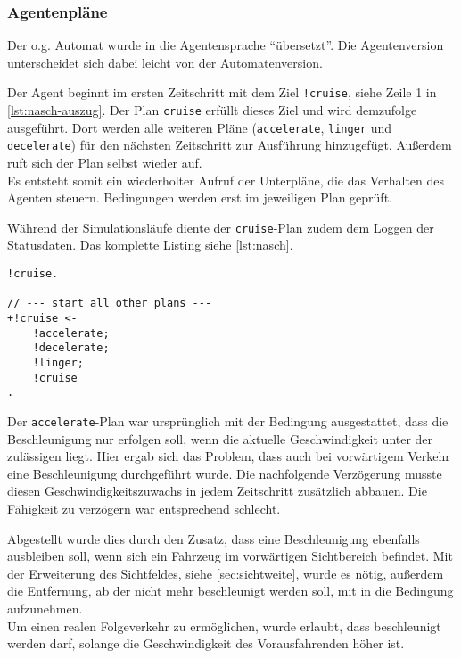 \subsubsection{Agentenpläne}

Der o.g. Automat wurde in die Agentensprache \enquote{übersetzt}. 
Die Agentenversion unterscheidet sich dabei leicht von der Automatenversion. 

Der Agent beginnt im ersten Zeitschritt mit dem Ziel \texttt{!cruise}, siehe Zeile 1 in \cref{lst:nasch-auszug}.
Der Plan \texttt{cruise} erfüllt dieses Ziel und wird demzufolge ausgeführt. 
Dort werden alle weiteren Pläne (\texttt{accelerate}, \texttt{linger} und \texttt{decelerate}) für den nächsten Zeitschritt zur Ausführung hinzugefügt.
Außerdem ruft sich der Plan selbst wieder auf.
\\
Es entsteht somit ein wiederholter Aufruf der Unterpläne, die das Verhalten des Agenten steuern.
Bedingungen werden erst im jeweiligen Plan geprüft.

Während der Simulationsläufe diente der \texttt{cruise}-Plan zudem dem Loggen der Statusdaten.
Das komplette Listing siehe \cref{lst:nasch}.

\begin{minipage}[hptb]{0.95\textwidth}
\begin{lstlisting}[style=asl, 
                   keywords={!cruise}, 
                   keywords={[2]}, 
                   keywords={[3]}, 
                   caption={Auszug aus Agentenscript: single lane-Version},
                   label={lst:nasch-auszug}]      
!cruise.

// --- start all other plans ---
+!cruise <-
    !accelerate;
    !decelerate;
    !linger;
    !cruise
.\end{lstlisting}
\end{minipage}

Der \texttt{accelerate}-Plan war ursprünglich mit der Bedingung ausgestattet, dass die Beschleunigung nur erfolgen soll, wenn die aktuelle Geschwindigkeit unter der zulässigen liegt.
Hier ergab sich das Problem, dass auch bei vorwärtigem Verkehr eine Beschleunigung durchgeführt wurde. Die nachfolgende Verzögerung musste diesen Geschwindigkeitszuwachs in jedem Zeitschritt zusätzlich abbauen.
Die Fähigkeit zu verzögern war entsprechend schlecht.

Abgestellt wurde dies durch den Zusatz, dass eine Beschleunigung ebenfalls ausbleiben soll, wenn sich ein Fahrzeug im vorwärtigen Sichtbereich befindet.
Mit der Erweiterung des Sichtfeldes, siehe \cref{sec:sichtweite}, wurde es nötig, außerdem die Entfernung, ab der nicht mehr beschleunigt werden soll, mit in die Bedingung aufzunehmen.
\\
Um einen realen Folgeverkehr zu ermöglichen, wurde erlaubt, dass beschleunigt werden darf, solange die Geschwindigkeit des Vorausfahrenden höher ist.

